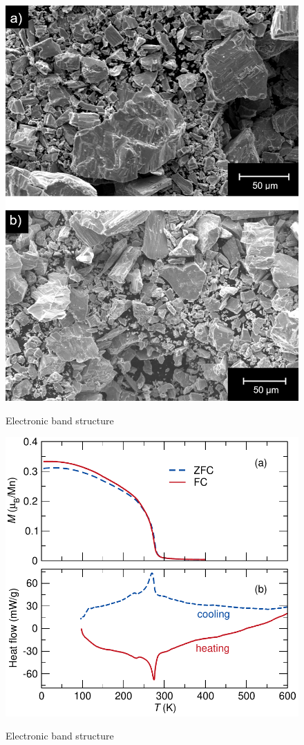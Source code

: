 \documentclass[11pt,edeposit,draftthesis]{uiucthesis2020}
\begin{document}
\begin{mainmatter}
\begin{figure}
\centering\includegraphics[width=0.5\columnwidth]{figures/ch6/Mn3As2_SEM_image.png} \\
\caption{\label{fig:Mn3As2_SEM}
Electronic band structure
}
\end{figure}

\begin{figure}
\centering\includegraphics[width=\columnwidth]{figures/ch6/FC_ZFC_DSC_Mn3As2_cropped.pdf} \\
\caption{\label{fig:Mn3As2_FC_ZFC_DSC}
Electronic band structure
}
\end{figure}


\end{mainmatter}
\end{document}
